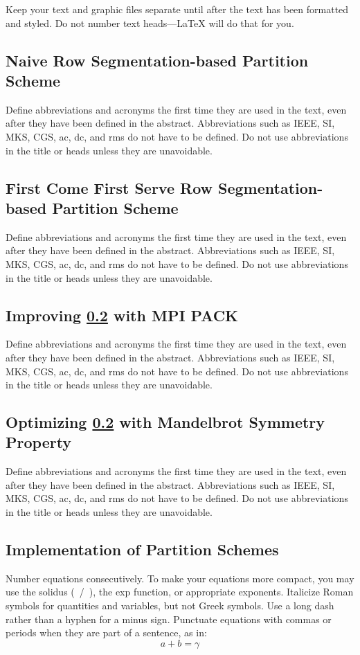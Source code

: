 \documentclass[conference]{IEEEtran}
\begin{document}
	Keep your text and graphic files separate until after the text has been 
	formatted and styled. Do not number text heads---{\LaTeX} will do that 
	for you.
	
			\subsection{Naive Row Segmentation-based Partition Scheme }\label{Naive}
			Define abbreviations and acronyms the first time they are used in the text, 
			even after they have been defined in the abstract. Abbreviations such as 
			IEEE, SI, MKS, CGS, ac, dc, and rms do not have to be defined. Do not use 
			abbreviations in the title or heads unless they are unavoidable.
			
			\subsection{First Come First Serve Row Segmentation-based Partition Scheme}\label{FCFS}
			Define abbreviations and acronyms the first time they are used in the text, 
			even after they have been defined in the abstract. Abbreviations such as 
			IEEE, SI, MKS, CGS, ac, dc, and rms do not have to be defined. Do not use 
			abbreviations in the title or heads unless they are unavoidable.
			
			
			\subsection{Improving \ref{FCFS} with MPI PACK }\label{FCFS_PACK}
			Define abbreviations and acronyms the first time they are used in the text, 
			even after they have been defined in the abstract. Abbreviations such as 
			IEEE, SI, MKS, CGS, ac, dc, and rms do not have to be defined. Do not use 
			abbreviations in the title or heads unless they are unavoidable.
			
						
			\subsection{Optimizing \ref{FCFS} with Mandelbrot  Symmetry Property}\label{SYM}
			Define abbreviations and acronyms the first time they are used in the text, 
			even after they have been defined in the abstract. Abbreviations such as 
			IEEE, SI, MKS, CGS, ac, dc, and rms do not have to be defined. Do not use 
			abbreviations in the title or heads unless they are unavoidable.
						
	\subsection{Implementation of Partition Schemes}
	Number equations consecutively. To make your 
	equations more compact, you may use the solidus (~/~), the exp function, or 
	appropriate exponents. Italicize Roman symbols for quantities and variables, 
	but not Greek symbols. Use a long dash rather than a hyphen for a minus 
	sign. Punctuate equations with commas or periods when they are part of a 
	sentence, as in:
	\begin{equation}
	a+b=\gamma\label{eq}
	\end{equation}
	
\end{document}
